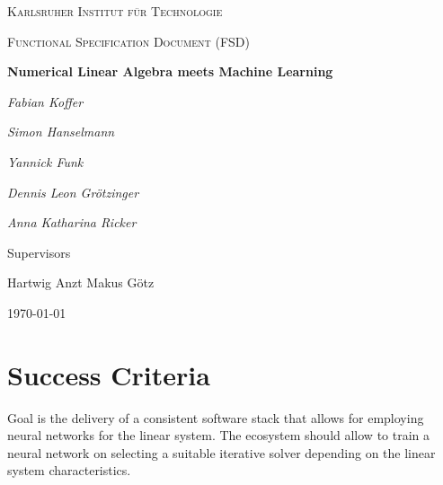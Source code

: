 \documentclass[parskip=full]{scrartcl}
\begin{document}
\begin{titlepage}
\centering
{\scshape\LARGE Karlsruher Institut für Technologie\par}
\vspace{1cm}
{\scshape\Large Functional Specification Document (FSD)\par}
\vspace{1.5cm}
{\huge\bfseries Numerical Linear Algebra meets Machine Learning \par}
\vspace {2cm}

{\Large\itshape Fabian Koffer\par}
{\Large\itshape Simon Hanselmann\par}
{\Large\itshape Yannick Funk\par}
{\Large\itshape Dennis Leon Gr\"{o}tzinger\par}
{\Large\itshape Anna Katharina Ricker\par}

\vfill
Supervisors\par
Hartwig Anzt
Makus G\"{o}tz

\vfill
{\large\today\par}
\end{titlepage}



\section{Success Criteria}

Goal is the delivery of a consistent software stack that allows for employing 
\glspl{neural network} for the linear system. 
The ecosystem should allow to train a \gls{neural network} on selecting a suitable \gls{iterative solver} depending on the linear system characteristics.
\end{document}
